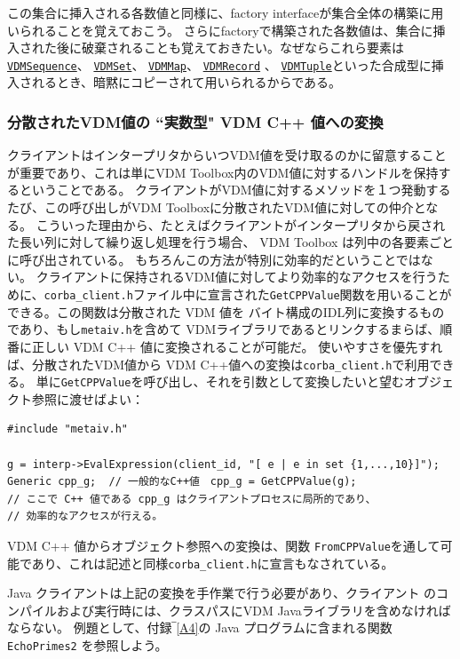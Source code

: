 \documentclass[\pformat,12pt]{jarticle}
\newcommand{\VDMMap}{\hyperlink{interface.VDMMap}{VDMMap}}
\newcommand{\VDMRecord}{\hyperlink{interface.VDMRecord}{VDMRecord}}
\newcommand{\VDMSequence}{\hyperlink{interface.VDMSequence}{VDMSequence}}
\newcommand{\VDMSet}{\hyperlink{interface.VDMSet}{VDMSet}}
\newcommand{\VDMTuple}{\hyperlink{interface.VDMTuple}{VDMTuple}}
\begin{document}
この集合に挿入される各数値と同様に、factory interfaceが集合全体の構築に用いられることを覚えておこう。
さらにfactoryで構築された各数値は、集合に挿入された後に破棄されることも覚えておきたい。なぜならこれら要素は{\tt \VDMSequence}、 {\tt  \VDMSet}、 {\tt \VDMMap}、 {\tt \VDMRecord} 、 {\tt \VDMTuple}といった合成型に挿入されるとき、暗黙にコピーされて用いられるからである。

\subsubsection{分散されたVDM値の ``実数型" VDM C++ 値への変換　}

クライアントはインタープリタからいつVDM値を受け取るのかに留意することが重要であり、これは単にVDM Toolbox内のVDM値に対するハンドルを保持するということである。
クライアントがVDM値に対するメソッドを１つ発動するたび、この呼び出しがVDM Toolboxに分散されたVDM値に対しての仲介となる。
こういった理由から、たとえばクライアントがインタープリタから戻された長い列に対して繰り返し処理を行う場合、 VDM Toolbox は列中の各要素ごとに呼び出されている。
もちろんこの方法が特別に効率的だということではない。
クライアントに保持されるVDM値に対してより効率的なアクセスを行うために、\texttt{corba\_client.h}ファイル中に宣言された{\tt GetCPPValue}関数を用いることができる。この関数は分散された VDM 値を バイト構成のIDL列に変換するものであり、もし{\tt metaiv.h}を含めて VDMライブラリである\cite{LibMan-CSK}とリンクするまらば、順番に正しい VDM C++ 値に変換されることが可能だ。
使いやすさを優先すれば、分散されたVDM値から VDM C++値への変換は{\tt corba\_client.h}で利用できる。
単に{\tt GetCPPValue}を呼び出し、それを引数として変換したいと望むオブジェクト参照に渡せばよい：

\begin{verbatim}
#include "metaiv.h"

g = interp->EvalExpression(client_id, "[ e | e in set {1,...,10}]");
Generic cpp_g;  // 一般的なC++値　cpp_g = GetCPPValue(g);
// ここで C++ 値である cpp_g はクライアントプロセスに局所的であり、
// 効率的なアクセスが行える。
\end{verbatim}

 VDM C++ 値からオブジェクト参照への変換は、関数 {\tt FromCPPValue}を通して可能であり、これは記述と同様{\tt corba\_client.h}に宣言もなされている。

Java クライアントは上記の変換を手作業で行う必要があり、クライアント \cite{CGJavaManPP-CSK}のコンパイルおよび実行時には、クラスパスにVDM Javaライブラリを含めなければならない。
例題として、付録‾\ref{A4}の Java プログラムに含まれる関数 \texttt{EchoPrimes2} を参照しよう。
\end{document}
